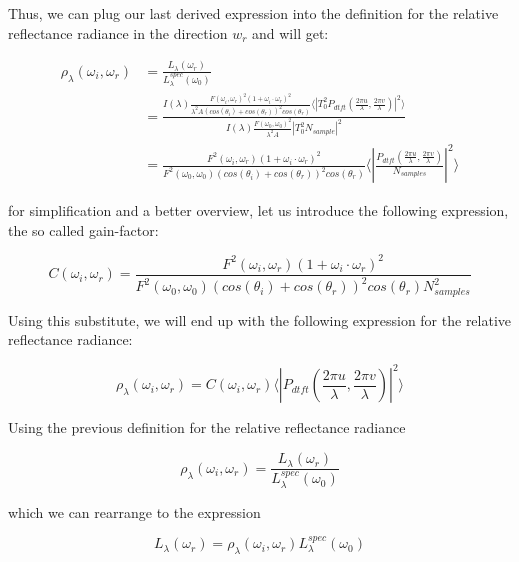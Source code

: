Thus, we can plug our last derived expression into the definition for the relative reflectance radiance in the direction $w_r$ and will get:

\begin{align*}
\rho_\lambda(\omega_i,\omega_r)
& = \frac{L_\lambda(\omega_r)}{L_\lambda^{spec}(\omega_0)} \\
& = \frac{I(\lambda) \frac{F(\omega_i, \omega_r)^2 (1 + \omega_i \cdot \omega_r)^2}{\lambda^2 A (cos(\theta_i)+cos(\theta_r))^2 cos(\theta_r)} \langle \left|T_0^2 P_{dtft}(\frac{2\pi u}{\lambda}, \frac{2\pi v}{\lambda}) \right|^2\rangle}{I(\lambda) \frac{F(\omega_0, \omega_0)^2}{\lambda^2 A}\left| T_0^2 N_{sample} \right|^2 } \\
& = \frac{F^2(\omega_i,\omega_r)(1 + \omega_i \cdot \omega_r)^2}{F^2(\omega_0,\omega_0)(cos(\theta_i)+cos(\theta_r))^2 cos(\theta_r)} \langle \left|\frac{P_{dtft}(\frac{2\pi u}{\lambda}, \frac{2\pi v}{\lambda})}{N_{samples}}\right|^2\rangle
\end{align*}

for simplification and a better overview, let us introduce the following expression, the so called gain-factor:

\begin{equation} 
    C(\omega_i,\omega_r) = \frac{F^2(\omega_i,\omega_r)(1 + \omega_i \cdot \omega_r)^2}{F^2(\omega_0,\omega_0)(cos(\theta_i)+cos(\theta_r))^2 cos(\theta_r) N_{samples}^2}
\label{eq:cfact}
\end{equation}

Using this substitute, we will end up with the following expression for the relative reflectance radiance:

\begin{equation}
\rho_\lambda(\omega_i,\omega_r) =  C(\omega_i,\omega_r) \langle \left|P_{dtft}(\frac{2\pi u}{\lambda}, \frac{2\pi v}{\lambda})\right|^2\rangle
\end{equation}

Using the previous definition for the relative reflectance radiance 

\begin{equation}
 \rho_\lambda(\omega_i,\omega_r) = \frac{L_\lambda(\omega_r)}{L_\lambda^{spec}(\omega_0)} 
\end{equation}

which we can rearrange to the expression 

\begin{equation}
L_\lambda(\omega_r) = \rho_\lambda(\omega_i,\omega_r)L_\lambda^{spec}(\omega_0)
\end{equation}

